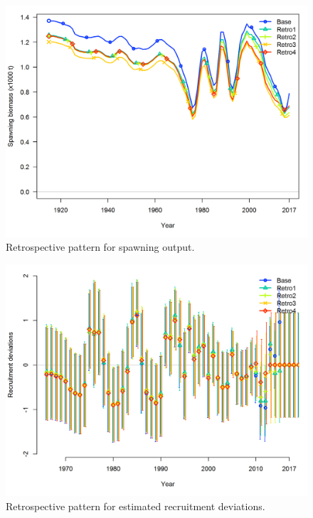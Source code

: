 \documentclass[12pt,]{article}
\begin{document}
\FloatBarrier

\begin{figure}[htbp]
\centering
\includegraphics{Figures/retro_spawnb.png}
\caption{Retrospective pattern for spawning output.
\label{fig:retro_spawnb}}
\end{figure}

\FloatBarrier

\begin{figure}[htbp]
\centering
\includegraphics{Figures/retro_recdev.png}
\caption{Retrospective pattern for estimated recruitment deviations.
\label{fig:retro_recdev}}
\end{figure}
\end{document}
